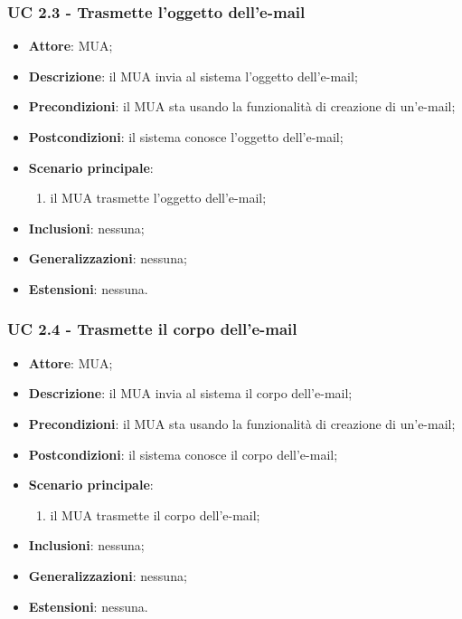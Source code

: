     \subsubsection{UC 2.3 - Trasmette l'oggetto dell'e-mail} \label{sec:UC2.3}
    \begin{itemize}
        \item \textbf{Attore}: MUA;
        \item \textbf{Descrizione}: il MUA invia al sistema l'oggetto dell'e-mail;
        \item \textbf{Precondizioni}: il MUA sta usando la funzionalità di creazione di un'e-mail;
        \item \textbf{Postcondizioni}: il sistema conosce l'oggetto dell'e-mail;
        \item \textbf{Scenario principale}:
            \begin{enumerate}
                \item il MUA trasmette l'oggetto dell'e-mail;
            \end{enumerate}
        \item \textbf{Inclusioni}: nessuna;
        \item \textbf{Generalizzazioni}: nessuna;
        \item \textbf{Estensioni}: nessuna.
    \end{itemize}

    \subsubsection{UC 2.4 - Trasmette il corpo dell'e-mail} \label{sec:UC2.4}
    \begin{itemize}
        \item \textbf{Attore}: MUA;
        \item \textbf{Descrizione}: il MUA invia al sistema il corpo dell'e-mail;
        \item \textbf{Precondizioni}: il MUA sta usando la funzionalità di creazione di un'e-mail;
        \item \textbf{Postcondizioni}: il sistema conosce il corpo dell'e-mail;
        \item \textbf{Scenario principale}:
            \begin{enumerate}
                \item il MUA trasmette il corpo dell'e-mail;
            \end{enumerate}
        \item \textbf{Inclusioni}: nessuna;
        \item \textbf{Generalizzazioni}: nessuna;
        \item \textbf{Estensioni}: nessuna.
    \end{itemize}

